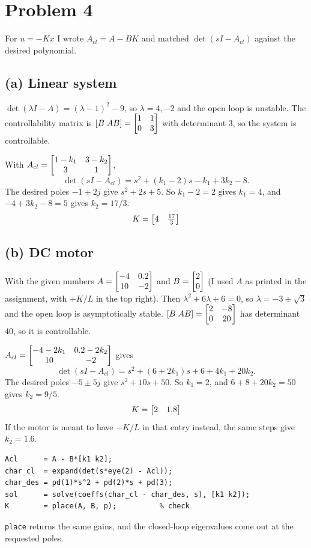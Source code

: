 \section*{Problem 4}

For $u=-Kx$ I wrote $A_{cl}=A-BK$ and matched $\det(sI-A_{cl})$ against the desired polynomial.

\subsection*{(a) Linear system}

$\det(\lambda I-A)=(\lambda-1)^2-9$, so $\lambda=4,-2$ and the open loop is unstable. The controllability matrix is $[B\;AB]=\begin{bmatrix}1&1\\0&3\end{bmatrix}$ with determinant $3$, so the system is controllable.

With $A_{cl}=\begin{bmatrix}1-k_1&3-k_2\\3&1\end{bmatrix}$,
\[
\det(sI-A_{cl})=s^2+(k_1-2)s-k_1+3k_2-8 .
\]
The desired poles $-1\pm2j$ give $s^2+2s+5$. So $k_1-2=2$ gives $k_1=4$, and $-4+3k_2-8=5$ gives $k_2=17/3$.
\[
K=\begin{bmatrix}4&\tfrac{17}{3}\end{bmatrix}
\]

\subsection*{(b) DC motor}

With the given numbers $A=\begin{bmatrix}-4&0.2\\10&-2\end{bmatrix}$ and $B=\begin{bmatrix}2\\0\end{bmatrix}$ (I used $A$ as printed in the assignment, with $+K/L$ in the top right). Then $\lambda^2+6\lambda+6=0$, so $\lambda=-3\pm\sqrt3$ and the open loop is asymptotically stable. $[B\;AB]=\begin{bmatrix}2&-8\\0&20\end{bmatrix}$ has determinant $40$, so it is controllable.

$A_{cl}=\begin{bmatrix}-4-2k_1&0.2-2k_2\\10&-2\end{bmatrix}$ gives
\[
\det(sI-A_{cl})=s^2+(6+2k_1)s+6+4k_1+20k_2 .
\]
The desired poles $-5\pm5j$ give $s^2+10s+50$. So $k_1=2$, and $6+8+20k_2=50$ gives $k_2=9/5$.
\[
K=\begin{bmatrix}2&1.8\end{bmatrix}
\]
If the motor is meant to have $-K/L$ in that entry instead, the same steps give $k_2=1.6$.

\begin{lstlisting}
Acl      = A - B*[k1 k2];
char_cl  = expand(det(s*eye(2) - Acl));
char_des = pd(1)*s^2 + pd(2)*s + pd(3);
sol      = solve(coeffs(char_cl - char_des, s), [k1 k2]);
K        = place(A, B, p);          % check
\end{lstlisting}

\texttt{place} returns the same gains, and the closed-loop eigenvalues come out at the requested poles.
